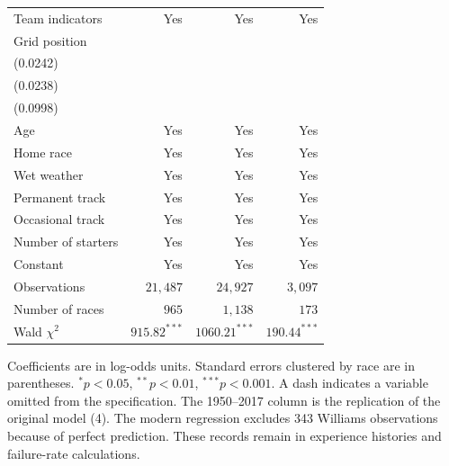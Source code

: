 \begin{table}[!htbp]
\begin{tabular*}{\linewidth}{@{\extracolsep{\fill}}lrrr@{}}
Team indicators & Yes & Yes & Yes \\
Grid position & \shortstack[r]{$-0.4388^{***}$\\{\scriptsize (0.0242)}} & \shortstack[r]{$-0.4514^{***}$\\{\scriptsize (0.0238)}} & \shortstack[r]{$-0.4877^{***}$\\{\scriptsize (0.0998)}} \\
Age & Yes & Yes & Yes \\
Home race & Yes & Yes & Yes \\
Wet weather & Yes & Yes & Yes \\
Permanent track & Yes & Yes & Yes \\
Occasional track & Yes & Yes & Yes \\
Number of starters & Yes & Yes & Yes \\
Constant & Yes & Yes & Yes \\
Observations & $21,487$ & $24,927$ & $3,097$ \\
Number of races & $965$ & $1,138$ & $173$ \\
Wald $\chi^2$ & $915.82^{***}$ & $1060.21^{***}$ & $190.44^{***}$ \\
\bottomrule
\end{tabular*}
\par\vspace{4pt}\begin{minipage}{\linewidth}\footnotesize
Coefficients are in log-odds units. Standard errors clustered by race are in parentheses.
$^{*}p<0.05$, $^{**}p<0.01$, $^{***}p<0.001$. A dash indicates a variable omitted from the specification.
The 1950--2017 column is the replication of the original model (4). The modern regression excludes 343 Williams observations because of perfect prediction. These records remain in experience histories and failure-rate calculations.
\end{minipage}
\end{table}
